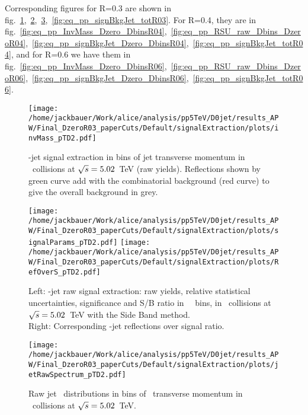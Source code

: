 Corresponding figures for R=0.3 are shown in fig.~\ref{fig:eq_pp_InvMass_Dzero_DbinsR03},~\ref{fig:eq_pp_RSU_raw_Dbins_DzeroR03},~\ref{fig:eq_pp_signBkgJet_Dzero_DbinsR03},~\ref{fig:eq_pp_signBkgJet_totR03}.
For R=0.4, they are in fig.~\ref{fig:eq_pp_InvMass_Dzero_DbinsR04},~\ref{fig:eq_pp_RSU_raw_Dbins_DzeroR04},~\ref{fig:eq_pp_signBkgJet_Dzero_DbinsR04},~\ref{fig:eq_pp_signBkgJet_totR04}, and for R=0.6 we have them in fig.~\ref{fig:eq_pp_InvMass_Dzero_DbinsR06},~\ref{fig:eq_pp_RSU_raw_Dbins_DzeroR06},~\ref{fig:eq_pp_signBkgJet_Dzero_DbinsR06},~\ref{fig:eq_pp_signBkgJet_totR06}.
\begin{figure}[bth]
\centering
\texttt{[image: /home/jackbauer/Work/alice/analysis/pp5TeV/D0jet/results\_APW/Final\_DzeroR03\_paperCuts/Default/signalExtraction/plots/invMass\_pTD2.pdf]}
\caption{\Dzero-jet signal extraction in bins of jet transverse momentum in \pp\ collisions at $\sqrt{s}=5.02$~TeV (raw yields). %
Reflections shown by green curve add with the combinatorial background (red curve) to give the overall background in grey.
}
\label{fig:eq_pp_InvMass_Dzero_DbinsR03}
\end{figure}

\begin{figure}[bth]
\centering
\texttt{[image: /home/jackbauer/Work/alice/analysis/pp5TeV/D0jet/results\_APW/Final\_DzeroR03\_paperCuts/Default/signalExtraction/plots/signalParams\_pTD2.pdf]}
\texttt{[image: /home/jackbauer/Work/alice/analysis/pp5TeV/D0jet/results\_APW/Final\_DzeroR03\_paperCuts/Default/signalExtraction/plots/RefOverS\_pTD2.pdf]}
\caption{Left: \Dzero-jet raw signal extraction: raw yields, relative statistical uncertainties, significance and S/B ratio in \Dzero\ \pt\ bins, in \pp\ collisions at $\sqrt{s}=5.02$~TeV with the Side Band method.
\\Right: Corresponding \Dzero-jet reflections over signal ratio.}
\label{fig:eq_pp_RSU_raw_Dbins_DzeroR03}
\end{figure}

\begin{figure}[bth]
\centering
\texttt{[image: /home/jackbauer/Work/alice/analysis/pp5TeV/D0jet/results\_APW/Final\_DzeroR03\_paperCuts/Default/signalExtraction/plots/jetRawSpectrum\_pTD2.pdf]}
\caption{Raw jet \pt\ distributions in bins of \Dzero\ transverse momentum in \pp\ collisions at $\sqrt{s}=5.02$~TeV.}
\label{fig:eq_pp_signBkgJet_Dzero_DbinsR03}
\end{figure}

